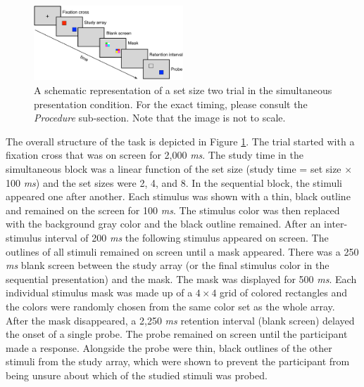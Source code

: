 \begin{figure}[t]
 	\centering
	\includegraphics[width=0.5\textwidth]{figures/paradigm}
	\caption{A schematic representation of a set size two trial in the simultaneous presentation condition. For the exact timing, please consult the \emph{Procedure} sub-section. Note that the image is not to scale.}

	\label{fig:paradigm}
\end{figure}


The overall structure of the task is depicted in Figure \ref{fig:paradigm}. The trial started with a fixation cross that was on screen for 2,000 \emph{ms}. The study time in the simultaneous block was a linear function of the set size (study time = set size $\times$ 100 \emph{ms}) and the set sizes were 2, 4, and 8. In the sequential block, the stimuli appeared one after another. Each stimulus was shown with a thin, black outline and remained on the screen for 100 \emph{ms}. The stimulus color was then replaced with the background gray color and the black outline remained. After an inter-stimulus interval of 200 \emph{ms} the following stimulus appeared on screen. The outlines of all stimuli remained on screen until a mask appeared. There was a 250 \emph{ms} blank screen between the study array (or the final stimulus color in the sequential presentation) and the mask. The mask was displayed for 500 \emph{ms}. Each individual stimulus mask was made up of a $4 \times 4$ grid of colored rectangles and the colors were randomly chosen from the same color set as the whole array. After the mask disappeared, a 2,250 \emph{ms} retention interval (blank screen) delayed the onset of a single probe. The probe remained on screen until the participant made a response. Alongside the probe were thin, black outlines of the other stimuli from the study array, which were shown to prevent the participant from being unsure about which of the studied stimuli was probed.
